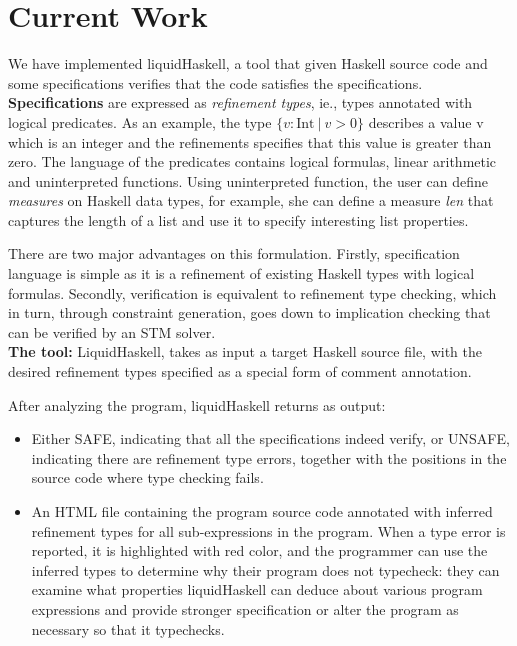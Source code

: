 \section*{Current Work}
We have implemented liquidHaskell, a tool that given Haskell source code 
and some specifications 
verifies that the code
satisfies the specifications.\\

\textbf{Specifications}
are expressed as \textit{refinement types}, ie., types annotated with logical predicates.
As an example, the type $\{v : \text{Int}\ |\ v > 0\}$ describes a value v which is an integer 
and the refinements specifies that this value is greater than zero.
%
The language of the predicates contains logical formulas, linear arithmetic and uninterpreted functions. 
%
Using uninterpreted function, the user can define \textit{measures} on Haskell data types, 
for example, she can define a measure \textit{len} that captures the length of a list 
and use it to specify interesting list properties.

There are two major advantages on this formulation.
%
Firstly, specification language is simple
as it is a refinement of existing Haskell types with logical formulas.
%
Secondly, verification is equivalent to refinement type checking,
which in turn, through constraint generation, goes down to implication checking
that can be verified by an STM solver.
\\

\textbf{The tool:}
LiquidHaskell, takes as input
a target Haskell source file, with the desired refinement types specified as a special
form of comment annotation.

After analyzing the program, liquidHaskell returns as output:

\begin{itemize}
\item
 Either SAFE, indicating that all the specifications indeed verify, or UNSAFE, indicating there are refinement type errors, together with the positions in the source
code where type checking fails.
\item
An HTML file containing the program source code annotated with inferred refinement types for all sub-expressions in the program. 
When a type error is reported,  it is highlighted with red color, and the programmer can use the inferred
types to determine why their program does not typecheck: they can examine what
properties liquidHaskell can deduce about various program expressions and 
provide stronger specification or alter the program as necessary so that it typechecks.
\end{itemize}


